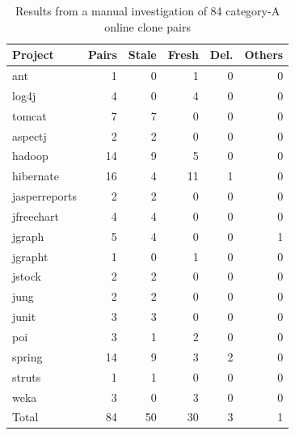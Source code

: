 \documentclass{sig-alternate-05-2015}
\begin{document}
\begin{table}
	\centering
	\caption{Results from a manual investigation of 84 category-A online clone pairs}
	\label{tab:stale_code}
	\small
	\begin{tabular}{l|r|r|r|r|r}
		\hline 
		Project & Pairs & Stale & Fresh & Del. & Others \\
		\hline
		ant & 1 & 0 & 1 & 0 & 0 \\
		log4j & 4 & 0 & 4 & 0 & 0 \\
		tomcat & 7 & 7 & 0 & 0 & 0 \\
		aspectj & 2 & 2 & 0 & 0 & 0 \\
		hadoop & 14 & 9 & 5 & 0 & 0 \\
		hibernate & 16 & 4 & 11 & 1 & 0 \\
		jasperreports & 2 & 2 & 0 & 0 & 0 \\
		jfreechart & 4 & 4 & 0 & 0 & 0 \\
		jgraph & 5 & 4 & 0 & 0 & 1 \\
		jgrapht & 1 & 0 & 1 & 0 & 0 \\
		jstock & 2 &  2 & 0 & 0 & 0 \\
		jung & 2 & 2 & 0 & 0 & 0 \\
		junit & 3 & 3 & 0 & 0 & 0 \\
		poi & 3 & 1 & 2 & 0 & 0 \\
		spring & 14 & 9 & 3 & 2 & 0 \\
		struts & 1 & 1 & 0 & 0 & 0 \\
		weka & 3 & 0 & 3 & 0 & 0 \\
		\hline
		Total & 84 & 50 & 30 & 3 & 1 \\
		\hline
	\end{tabular} 
\end{table}
\end{document}
